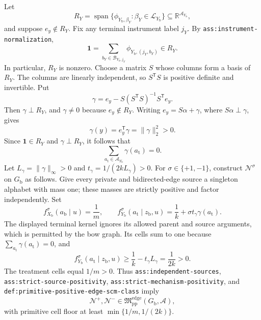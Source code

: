 Let
\[
 R_Y=\operatorname{span}\{\phi_{Y_{\mathrm b},\beta_Y}:\beta_Y\in\mathcal L_{Y_{\mathrm b}}\}
 \subseteq\mathbb R^{\mathcal A_{Y_{\mathrm b}}},
\]
and suppose \(e_y\notin R_Y\).  Fix any terminal instrument label \(j_Y\).  By \texttt{ass:instrument-normalization},
\[
 \mathbf 1=\sum_{b_Y\in\mathcal B_{Y_{\mathrm b},j_Y}}
 \phi_{Y_{\mathrm b},(j_Y,b_Y)}\in R_Y.
\]
In particular, \(R_Y\) is nonzero.  Choose a matrix \(S\) whose columns form a basis of \(R_Y\).  The columns are linearly independent, so \(S^{\mathsf T}S\) is positive definite and invertible.  Put
\[
 \gamma=e_y-S(S^{\mathsf T}S)^{-1}S^{\mathsf T}e_y.
\]
Then \(\gamma\perp R_Y\), and \(\gamma\ne0\) because \(e_y\notin R_Y\).  Writing \(e_y=S\alpha+\gamma\), where \(S\alpha\perp\gamma\), gives
\[
 \gamma(y)=e_y^{\mathsf T}\gamma=\lVert\gamma\rVert_2^2>0.
\]
Since \(\mathbf 1\in R_Y\) and \(\gamma\perp R_Y\), it follows that
\[
 \sum_{a_{\mathrm t}\in\mathcal A_{Y_{\mathrm b}}}\gamma(a_{\mathrm t})=0.
\]
Let \(L_\gamma=\lVert\gamma\rVert_\infty>0\) and \(t_\gamma=1/(2kL_\gamma)>0\).  For \(\sigma\in\{+1,-1\}\), construct \(\mathcal N^\sigma\) on \(G_{\mathrm b}\) as follows.  Give every private and bidirected-edge source a singleton alphabet with mass one; these masses are strictly positive and factor independently.  Set
\[
 f_{X_{\mathrm b}}^\sigma(a_{\mathrm b}\mid u)=\frac1m,
 \qquad
 f_{Y_{\mathrm b}}^\sigma(a_{\mathrm t}\mid z_{\mathrm b},u)
 =\frac1k+\sigma t_\gamma\gamma(a_{\mathrm t}).
\]
The displayed terminal kernel ignores its allowed parent and source arguments, which is permitted by the bow graph.  Its cells sum to one because \(\sum_{a_{\mathrm t}}\gamma(a_{\mathrm t})=0\), and
\[
 f_{Y_{\mathrm b}}^\sigma(a_{\mathrm t}\mid z_{\mathrm b},u)
 \ge \frac1k-t_\gamma L_\gamma=\frac1{2k}>0.
\]
The treatment cells equal \(1/m>0\).  Thus \texttt{ass:independent-sources}, \texttt{ass:strict-source-positivity}, \texttt{ass:strict-mechanism-positivity}, and \texttt{def:primitive-positive-edge-scm-class} imply
\[
 \mathcal N^+,\mathcal N^-\in
 \mathfrak M_{\mathrm{pp}}^{\mathrm{edge}}(G_{\mathrm b},\mathcal A),
\]
with primitive cell floor at least \(\min\{1/m,1/(2k)\}\).

